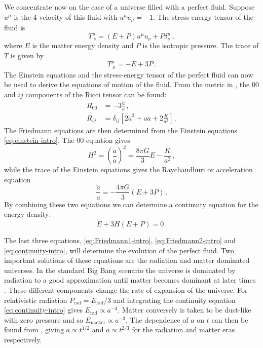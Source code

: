 We concentrate now on the case of a universe filled with a perfect
fluid. Suppose $u^\mu$ is the 4-velocity of this fluid with $u^\mu
u_\mu=-1$. The stress-energy tensor of the fluid is
% 
\begin{equation}
 \label{eq:fluidstress-intro}
  T^\mu_{~\nu} = (E + P)u^\mu u_\nu + P\delta^\mu_\nu \,,
\end{equation}
% 
where $E$ is the matter energy density and $P$ is the isotropic pressure.
The trace of $T$ is given by
% 
\begin{equation}
 \label{eq:Ttrace-intro}
  T^\mu_{~\mu} = -E + 3P\,.
\end{equation}
% 
The Einstein equations and the stress-energy tensor of the
perfect fluid can now be used to derive the equations of motion of the fluid.
From the metric in , the $00$ and $ij$ components of the
Ricci tensor can be found:
% 
\begin{align}
\label{eq:Ricci00-intro}
 R_{00} &= -3 \frac{\ddot{a}}{a} \,,\\
\label{eq:Ricciij-intro}
 R_{ij} &= \delta_{ij} \left[ 2\dot{a}^2 +
  a \ddot{a} + 2\frac{K}{a^2} \right] \,.
\end{align}
% 
The Friedmann equations are then determined from the Einstein equations
\eqref{eq:einstein-intro}.
The $00$ equation gives
% 
\begin{equation}
 \label{eq:Friedmann1-intro}
 H^2 = \left(\frac{\dot{a}}{a}\right)^2 = \frac{8\pi G}{3} E - \frac{K}{a^2}\,,
\end{equation}
% 
while the trace of the Einstein equations gives the Raychaudhuri or
acceleration equation
% 
\begin{equation}
 \label{eq:Friedmann2-intro}
 \frac{\ddot{a}}{a}  = -\frac{4\pi G}{3}(E + 3P)\,.
\end{equation}
% 
By combining these two equations we can determine a continuity equation for the
energy density:
\begin{equation}
 \label{eq:continuity-intro}
 \dot{E} + 3H(E+P) = 0 \,.
\end{equation}


The last three equations, \eqref{eq:Friedmann1-intro},
\eqref{eq:Friedmann2-intro}
and \eqref{eq:continuity-intro}, will determine the evolution of the
perfect fluid. Two important solutions of these equations are
the radiation and
matter dominated universes. In the standard Big Bang scenario the universe is
dominated by radiation to a good approximation until matter becomes dominant
at later times \cite{book:kolbturner}. These different components
change the rate of expansion
of the universe. For relativistic radiation $P_\mathrm{rad}=E_\mathrm{rad}/3$
and integrating the continuity equation \eqref{eq:continuity-intro} gives
$E_\mathrm{rad}\propto a^{-4}$. Matter conversely is taken to be dust-like with
zero
pressure and so $E_\mathrm{matter}\propto a^{-3}$. The dependence of $a$ on $t$
can then be
found from , giving $a\propto t^{1/2}$ and $a\propto
t^{2/3}$ for the radiation and matter eras respectively.


